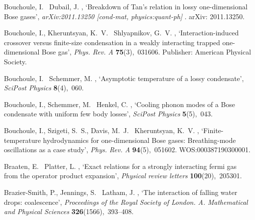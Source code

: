 \documentclass[onecolumn,amsfonts,showpacs,superscriptaddress]{revtex4-1}
\begin{document}
\begin{thebibliography}{xx}
Bouchoule, I. \harvardand\ Dubail, J.  \harvardyearright ,
  `Breakdown of {Tan}'s relation in lossy one-dimensional {Bose} gases', {\em
  arXiv:2011.13250 [cond-mat, physics:quant-ph]} .
\newblock arXiv: 2011.13250.

Bouchoule, I., Kheruntsyan, K.~V. \harvardand\ Shlyapnikov, G.~V.
  \harvardyearleft 2007\harvardyearright , `Interaction-induced crossover
  versus finite-size condensation in a weakly interacting trapped
  one-dimensional {Bose} gas', {\em Phys. Rev. A} {\bf 75}(3),~031606.
\newblock Publisher: American Physical Society.

Bouchoule, I. \harvardand\ Schemmer, M.  \harvardyearleft 2020\harvardyearright
  , `Asymptotic temperature of a lossy condensate', {\em SciPost Physics} {\bf
  8}(4),~060.

Bouchoule, I., Schemmer, M. \harvardand\ Henkel, C.  \harvardyearleft
  2018\harvardyearright , `Cooling phonon modes of a {Bose} condensate with
  uniform few body losses', {\em SciPost Physics} {\bf 5}(5),~043.

Bouchoule, I., Szigeti, S.~S., Davis, M.~J. \harvardand\ Kheruntsyan, K.~V.
  \harvardyearleft 2016\harvardyearright , `Finite-temperature hydrodynamics
  for one-dimensional {Bose} gases: {Breathing}-mode oscillations as a case
  study', {\em Phys. Rev. A} {\bf 94}(5),~051602.
\newblock WOS:000387190300001.

Braaten, E. \harvardand\ Platter, L.  \harvardyearright ,
  `Exact relations for a strongly interacting fermi gas from the operator
  product expansion', {\em Physical review letters} {\bf 100}(20),~205301.

Brazier-Smith, P., Jennings, S. \harvardand\ Latham, J.  \harvardyearright , `The interaction of falling water drops:
  coalescence', {\em Proceedings of the Royal Society of London. A.
  Mathematical and Physical Sciences} {\bf 326}(1566),~393--408.


\end{thebibliography}
\end{document}
